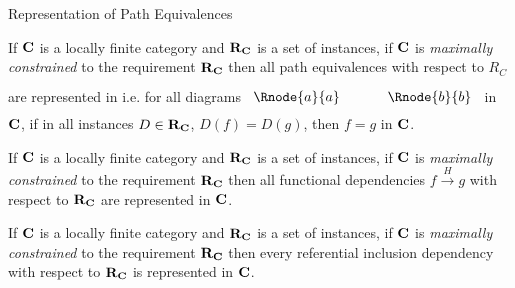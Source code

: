 \documentclass[xcolor=pst,dvips]{beamer}   %
\newcommand{\fundep}[3]{#2 \xrightarrow{#1} #3}  %
\begin{document}
\begin{frame}{Representation of Path Equivalences}
\begin{lemma}
If $\textbf{C}$ is a locally finite category and $\textbf{R}_{\textbf{C}}$ is a set of instances, if $\textbf{C}$ is 
\textit{maximally constrained} to the requirement $\textbf{R}_{\textbf{C}}$ then all path equivalences with respect
to $R_C$ are represented in \catcw
i.e. for all diagrams
$
\rule[-0.3cm]{0pt}{0.9cm} %
\begin{array}{c p{0.5cm} c  }
 \Rnode{a}{a}            &&   \Rnode{b}{b}
\end{array} 
$
in $\textbf{C}$,  if in all instances $D \in \textbf{R}_{\textbf{C}}$, $D(f)=D(g)$, 
then $f=g$ in $\textbf{C}$.
\end{lemma}
\end{frame}


\begin{frame}
\begin{lemma}
If $\textbf{C}$ is a locally finite category and $\textbf{R}_{\textbf{C}}$ is a set of instances, if $\textbf{C}$ is 
\textit{maximally constrained} to the requirement $\textbf{R}_{\textbf{C}}$ then
all functional dependencies $\fundep{H}{f}{g}$  with respect to $\textbf{R}_{\textbf{C}}$ are represented in $\textbf{C}$.
\end{lemma}
\end{frame}

\begin{frame}
\begin{lemma}
If $\textbf{C}$ is a locally finite category and $\textbf{R}_{\textbf{C}}$ is a set of instances, if $\textbf{C}$ is 
\textit{maximally constrained} to the requirement $\textbf{R}_{\textbf{C}}$ then
every referential inclusion dependency with respect to $\textbf{R}_{\textbf{C}}$ is represented in $\textbf{C}$.
\end{lemma}
\end{frame}

\iffalse
\begin{frame}{Bibliography}

\end{frame}
\fi

\end{document}

